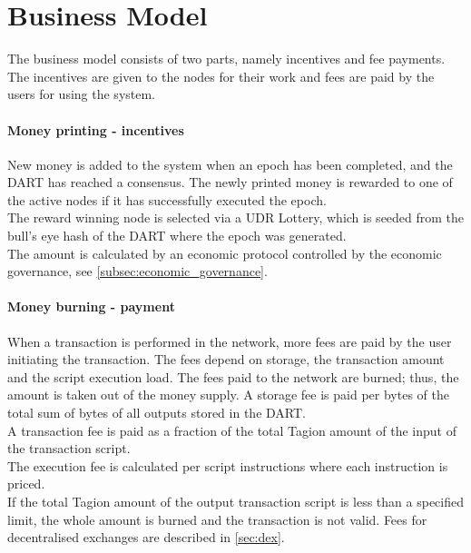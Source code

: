 \section{Business Model}
The business model consists of two parts, namely incentives and fee payments. The incentives are given to the nodes for their work and fees are paid by the users for using the system. 

\paragraph{Money printing - incentives }
New money is added to the system when an epoch has been completed, and the DART has reached a consensus. The newly printed money is rewarded to one of the active nodes if it has successfully executed the epoch. \\
The reward winning node is selected via a UDR Lottery, which is seeded from the bull’s eye hash of the DART where the epoch was generated. \\
The amount is calculated by an economic protocol controlled by the economic governance, see \cref{subsec:economic_governance}. \\

\paragraph{Money burning - payment}
When a transaction is performed in the network, more fees are paid by the user initiating the transaction. The fees depend on storage, the transaction amount and the script execution load. The fees paid to the network are burned; thus, the amount is taken out of the money supply.
A storage fee is paid per bytes of the total sum of bytes of all outputs stored in the DART. \\
A transaction fee is paid as a fraction of the total Tagion amount of the input of the transaction script. \\
The execution fee is calculated per script instructions where each instruction is priced. \\
If the total Tagion amount of the output transaction script is less than a specified limit, the whole amount is burned and the transaction is not valid.
Fees for decentralised exchanges are described in \cref{sec:dex}.
